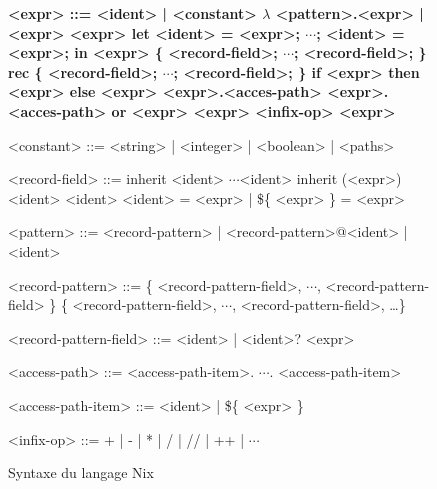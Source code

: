 \begin{figure}
  \def\dots{$\cdots$}
  \begin{grammar}
    \bfseries
    <expr> ::=
    <ident> | <constant>
    \alt $\lambda$ <pattern>.<expr> | <expr> <expr>
    \alt let <ident> = <expr>; \dots; <ident> = <expr>; in <expr>
    \alt [ <expr> \dots <expr> ]
    \alt \{ <record-field>; \dots; <record-field>; \}
    \alt rec \{ <record-field>; \dots; <record-field>; \}
    \alt if <expr> then <expr> else <expr>
    \alt <expr>.<acces-path>
    \alt <expr>.<acces-path> or <expr>
    \alt <expr> <infix-op> <expr>

    <constant> ::= <string> | <integer> | <boolean> | <paths>

    <record-field> ::= inherit <ident> \dots <ident>
    \alt inherit (<expr>) <ident> <ident>
    \alt <ident> = <expr> | \$\{ <expr> \} = <expr>

    <pattern> ::= <record-pattern> | <record-pattern>@<ident> | <ident>

    <record-pattern> ::= \{ <record-pattern-field>, \dots, <record-pattern-field> \}
    \alt \{ <record-pattern-field>, \dots, <record-pattern-field>, \ldots \}

    <record-pattern-field> ::= <ident> | <ident>? <expr>

    <access-path> ::= <access-path-item>. \dots . <access-path-item>

    <access-path-item> ::= <ident> | \$\{ <expr> \}

    <infix-op> ::= + | - | * | / | // | ++ | \dots
  \end{grammar}
  \caption{Syntaxe du langage Nix\label{nix::syntax}}
\end{figure}
